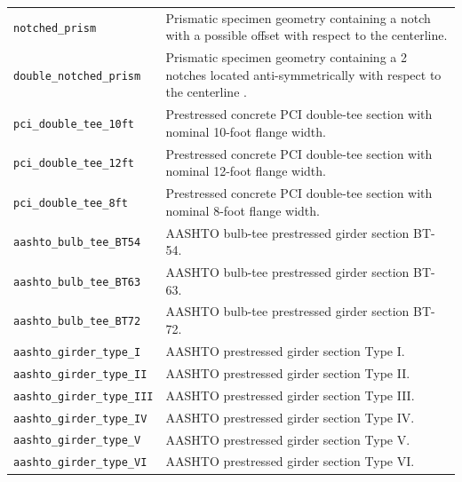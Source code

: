 \documentclass[11pt]{book}
\begin{document}
{\begin{longtable}{p{}p{}}
\texttt{notched\_prism} &
Prismatic specimen geometry containing a notch with a possible offset with respect to the centerline. \\

\texttt{double\_notched\_prism} &
Prismatic specimen geometry containing a 2 notches located anti-symmetrically with respect to the centerline . \\

\texttt{pci\_double\_tee\_10ft} &
Prestressed concrete PCI double-tee section with nominal 10-foot flange width. \\

\texttt{pci\_double\_tee\_12ft} &
Prestressed concrete PCI double-tee section with nominal 12-foot flange width. \\

\texttt{pci\_double\_tee\_8ft} &
Prestressed concrete PCI double-tee section with nominal 8-foot flange width. \\

\texttt{aashto\_bulb\_tee\_BT54} &
AASHTO bulb-tee prestressed girder section BT-54. \\

\texttt{aashto\_bulb\_tee\_BT63} &
AASHTO bulb-tee prestressed girder section BT-63. \\

\texttt{aashto\_bulb\_tee\_BT72} &
AASHTO bulb-tee prestressed girder section BT-72. \\

\texttt{aashto\_girder\_type\_I} &
AASHTO prestressed girder section Type I. \\

\texttt{aashto\_girder\_type\_II} &
AASHTO prestressed girder section Type II. \\

\texttt{aashto\_girder\_type\_III} &
AASHTO prestressed girder section Type III. \\

\texttt{aashto\_girder\_type\_IV} &
AASHTO prestressed girder section Type IV. \\

\texttt{aashto\_girder\_type\_V} &
AASHTO prestressed girder section Type V. \\

\texttt{aashto\_girder\_type\_VI} &
AASHTO prestressed girder section Type VI. \\

\hline
\end{longtable}


}
\end{document}
